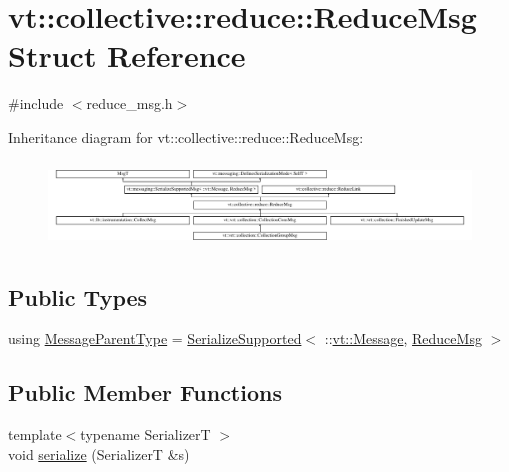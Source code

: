 \hypertarget{structvt_1_1collective_1_1reduce_1_1_reduce_msg}{}\section{vt\+:\+:collective\+:\+:reduce\+:\+:Reduce\+Msg Struct Reference}
\label{structvt_1_1collective_1_1reduce_1_1_reduce_msg}


{\ttfamily \#include $<$reduce\+\_\+msg.\+h$>$}

Inheritance diagram for vt\+:\+:collective\+:\+:reduce\+:\+:Reduce\+Msg\+:\begin{figure}[H]
\begin{center}
\leavevmode
\includegraphics[height=2.304527cm]{structvt_1_1collective_1_1reduce_1_1_reduce_msg}
\end{center}
\end{figure}
\subsection*{Public Types}
\begin{DoxyCompactItemize}
\item 
using \hyperlink{structvt_1_1collective_1_1reduce_1_1_reduce_msg_a5c736b83ddd821bdce047715e0b606f2}{Message\+Parent\+Type} = \hyperlink{namespacevt_a3862b8e3f67ab03f3a4313d828592fa9}{Serialize\+Supported}$<$ \+::\hyperlink{namespacevt_a3a3ddfef40b4c90915fa43cdd5f129ea}{vt\+::\+Message}, \hyperlink{structvt_1_1collective_1_1reduce_1_1_reduce_msg}{Reduce\+Msg} $>$
\end{DoxyCompactItemize}
\subsection*{Public Member Functions}
\begin{DoxyCompactItemize}
\item 
{\footnotesize template$<$typename SerializerT $>$ }\\void \hyperlink{structvt_1_1collective_1_1reduce_1_1_reduce_msg_acd139b8eebfbd0ea925dac39032e5717}{serialize} (SerializerT \&s)
\end{DoxyCompactItemize}
